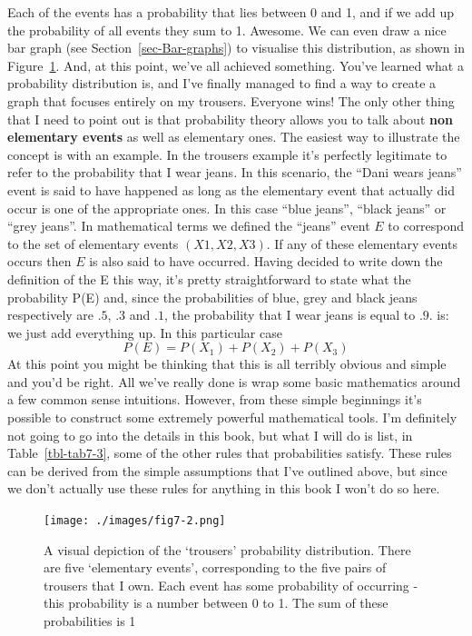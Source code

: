 \documentclass[
  letterpaper,
]{book}
\begin{document}
Each of the events has a probability that lies between 0 and 1, and if
we add up the probability of all events they sum to 1. Awesome. We can
even draw a nice bar graph (see Section~\ref{sec-Bar-graphs}) to
visualise this distribution, as shown in Figure~\ref{fig-fig7-2}. And,
at this point, we've all achieved something. You've learned what a
probability distribution is, and I've finally managed to find a way to
create a graph that focuses entirely on my trousers. Everyone wins! The
only other thing that I need to point out is that probability theory
allows you to talk about \textbf{non elementary events} as well as
elementary ones. The easiest way to illustrate the concept is with an
example. In the trousers example it's perfectly legitimate to refer to
the probability that I wear jeans. In this scenario, the ``Dani wears
jeans'' event is said to have happened as long as the elementary event
that actually did occur is one of the appropriate ones. In this case
``blue jeans'', ``black jeans'' or ``grey jeans''. In mathematical terms
we defined the ``jeans'' event \(E\) to correspond to the set of
elementary events \((X1, X2, X3)\). If any of these elementary events
occurs then \(E\) is also said to have occurred. Having decided to write
down the definition of the E this way, it's pretty straightforward to
state what the probability P(E) and, since the probabilities of blue,
grey and black jeans respectively are \(.5\), \(.3\) and \(.1\), the
probability that I wear jeans is equal to \(.9\). is: we just add
everything up. In this particular case \[P(E)=P(X_1)+P(X_2)+P(X_3)\] At
this point you might be thinking that this is all terribly obvious and
simple and you'd be right. All we've really done is wrap some basic
mathematics around a few common sense intuitions. However, from these
simple beginnings it's possible to construct some extremely powerful
mathematical tools. I'm definitely not going to go into the details in
this book, but what I will do is list, in Table~\ref{tbl-tab7-3}, some
of the other rules that probabilities satisfy. These rules can be
derived from the simple assumptions that I've outlined above, but since
we don't actually use these rules for anything in this book I won't do
so here.

\begin{figure}

\texttt{[image: ./images/fig7-2.png]} \hfill{}

\caption{\label{fig-fig7-2}A visual depiction of the `trousers'
probability distribution. There are five `elementary events',
corresponding to the five pairs of trousers that I own. Each event has
some probability of occurring - this probability is a number between 0
to 1. The sum of these probabilities is 1}

\end{figure}
\end{document}
